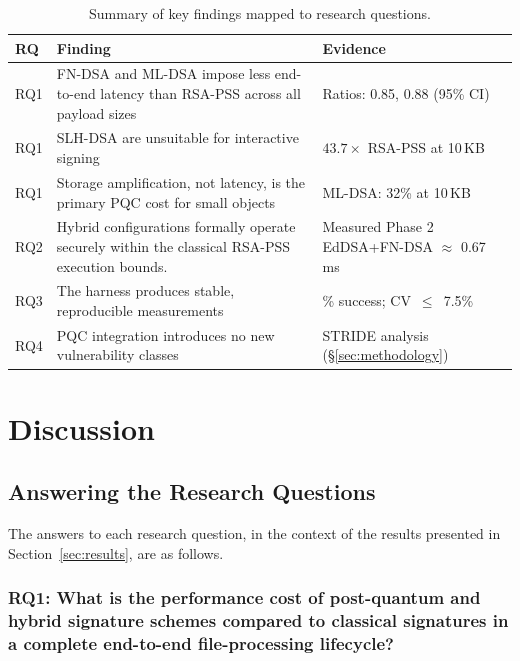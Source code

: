 \documentclass[12pt,a4paper]{article}
\begin{document}
\begin{table}[H]
\centering
\caption{Summary of key findings mapped to research questions.}
\label{tab:findings_summary}
\begin{tabularx}{\textwidth}{@{} l >{\raggedright\arraybackslash}X >{\raggedright\arraybackslash}l @{}}
\toprule
RQ & Finding & Evidence \\
\midrule
RQ1 & FN-DSA and ML-DSA impose less end-to-end latency
      than RSA-PSS across all payload sizes &
      Ratios: 0.85, 0.88 (95\% CI) \\[4pt]
RQ1 & SLH-DSA are unsuitable for interactive signing &
      $43.7\times$ RSA-PSS at 10\,KB \\[4pt]
RQ1 & Storage amplification, not latency, is the primary
      PQC cost for small objects &
      ML-DSA: 32\% at 10\,KB \\[4pt]
RQ2 & Hybrid configurations formally operate securely within the classical RSA-PSS execution bounds. &
      Measured Phase 2 EdDSA+FN-DSA $\approx$ 0.67\,ms \\[4pt]
RQ3 & The harness produces stable, reproducible measurements &
      99.998\% success; CV~$\leq$~7.5\% \\[4pt]
RQ4 & PQC integration introduces no new vulnerability classes &
      STRIDE analysis (\S\ref{sec:methodology}) \\
\bottomrule
\end{tabularx}
\end{table}

\newpage
\section{Discussion}
\label{sec:discussion}

\subsection{Answering the Research Questions}
\label{sec:discussion:rqs}

The answers to each research question, in the context of the results presented in Section~\ref{sec:results}, are as follows.

\subsubsection{RQ1: What is the performance cost of post-quantum and hybrid signature schemes compared to classical signatures in a complete end-to-end file-processing lifecycle?}
\end{document}
